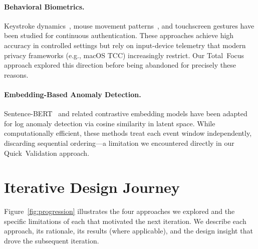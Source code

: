 \documentclass[letterpaper,twocolumn,10pt]{article}
\begin{document}
\paragraph{Behavioral Biometrics.}
Keystroke dynamics~\cite{monrose99}, mouse movement
patterns~\cite{ahmed07}, and touchscreen gestures have been studied
for continuous authentication.  These approaches achieve high
accuracy in controlled settings but rely on input-device telemetry
that modern privacy frameworks (e.g., macOS TCC) increasingly
restrict.  Our Total~Focus approach explored this direction before
being abandoned for precisely these reasons.

\paragraph{Embedding-Based Anomaly Detection.}
Sentence-BERT~\cite{reimers2019sentencebert} and related
contrastive embedding models have been adapted for log anomaly
detection via cosine similarity in latent space.  While
computationally efficient, these methods treat each event window
independently, discarding sequential ordering---a limitation we
encountered directly in our Quick~Validation approach.


\section{Iterative Design Journey}
\label{sec:approaches}

Figure~\ref{fig:progression} illustrates the four approaches we
explored and the specific limitations of each that motivated the
next iteration.  We describe each approach, its rationale, its
results (where applicable), and the design insight that drove the
subsequent iteration.
\end{document}
